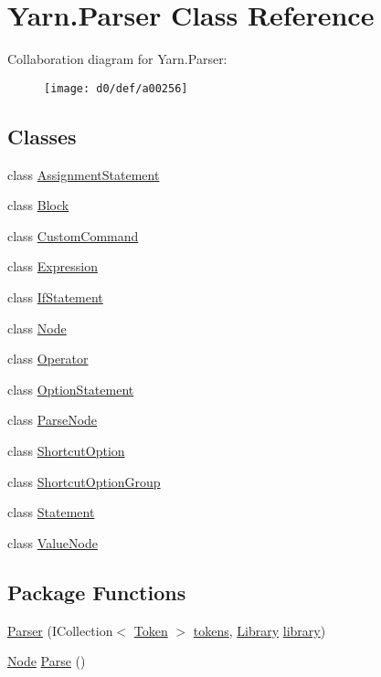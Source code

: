 \hypertarget{a00064}{\section{Yarn.\-Parser Class Reference}
\label{a00064}
}


Collaboration diagram for Yarn.\-Parser\-:
\nopagebreak
\begin{figure}[H]
\begin{center}
\leavevmode
\texttt{[image: d0/def/a00256]}
\end{center}
\end{figure}
\subsection*{Classes}
\begin{DoxyCompactItemize}
\item 
class \hyperlink{a00019}{Assignment\-Statement}
\item 
class \hyperlink{a00022}{Block}
\item 
class \hyperlink{a00032}{Custom\-Command}
\item 
class \hyperlink{a00040}{Expression}
\item 
class \hyperlink{a00043}{If\-Statement}
\item 
class \hyperlink{a00054}{Node}
\item 
class \hyperlink{a00058}{Operator}
\item 
class \hyperlink{a00061}{Option\-Statement}
\item 
class \hyperlink{a00063}{Parse\-Node}
\item 
class \hyperlink{a00070}{Shortcut\-Option}
\item 
class \hyperlink{a00071}{Shortcut\-Option\-Group}
\item 
class \hyperlink{a00076}{Statement}
\item 
class \hyperlink{a00087}{Value\-Node}
\end{DoxyCompactItemize}
\subsection*{Package Functions}
\begin{DoxyCompactItemize}
\item 
\hyperlink{a00064_acd2714b911fb5e7c38f0e07a9dc1af58}{Parser} (I\-Collection$<$ \hyperlink{a00079}{Token} $>$ \hyperlink{a00064_a1a4de646937057988b59d2ff8035eae3}{tokens}, \hyperlink{a00049}{Library} \hyperlink{a00064_a1313951b09177a1c83b6cf035139197a}{library})
\item 
\hyperlink{a00054}{Node} \hyperlink{a00064_a811cc7226f4f4a2f3440cdb67ad14468}{Parse} ()
\end{DoxyCompactItemize}
